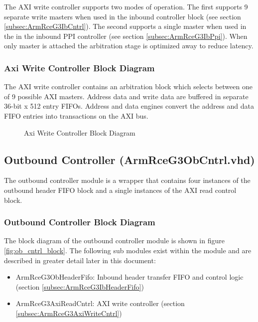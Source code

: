 \documentclass[11pt]{article}
\begin{document}
The AXI write controller supports two modes of operation. The first supports 9 separate write masters when
used in the inbound controller block (see section \ref{subsec:ArmRceG3IbCntrl}). The second supports a single 
master when used in the in the inbound PPI controller (see section \ref{subsec:ArmRceG3IbPpi}).
When only master is attached the arbitration stage is optimized away to reduce latency.

\subsubsection{Axi Write Controller Block Diagram}

The AXI write controller contains an arbitration block which selects between one of 9 possible AXI masters. Address data and write data
are buffered in separate 36-bit x 512 entry FIFOs. Address and data engines convert the address and data FIFO entries into transactions on the AXI bus.

\begin{figure}[H]
   \centering
   \caption{Axi Write Controller Block Diagram}
   \label{fig:axi_write_block}
\end{figure}

\subsection{Outbound Controller (ArmRceG3ObCntrl.vhd)}
\label{subsec:ArmRceG3ObCntrl}

The outbound controller module is a wrapper that contains four instances of the outbound header FIFO block and a single
instances of the AXI read control block. 

\subsubsection{Outbound Controller Block Diagram}

The block diagram of the outbound controller module is shown in figure \ref{fig:ob_cntrl_block}. The following sub modules
exist within the module and are described in greater detail later in this document:

\begin{itemize}
   \item ArmRceG3ObHeaderFifo: Inbound header transfer FIFO and control logic (section \ref{subsec:ArmRceG3IbHeaderFifo})
   \item ArmRceG3AxiReadCntrl: AXI write controller (section \ref{subsec:ArmRceG3AxiWriteCntrl})
\end{itemize}
\end{document}
